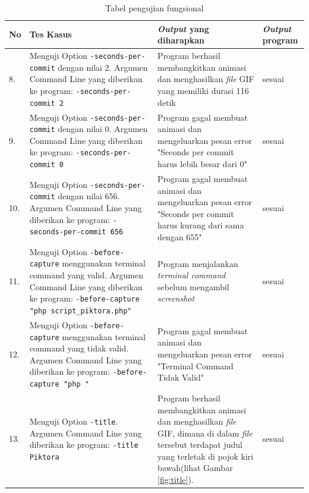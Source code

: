 \begin{table}[htbp]
\begin{tabular}{|p{0.3cm}|>{\raggedright} p{5.5 cm}| p{7 cm}| p{3 cm}|}
		
		
		
		\end{tabular}
	\label{table:hasil_pengujian1}
\end{table}


\begin{table}[htbp]
	\centering
	\caption{Tabel pengujian fungsional}
	
		\begin{tabular}{|p{0.3cm}|>{\raggedright} p{7 cm}| p{5.5 cm}| p{3 cm}|} \hline
		No & Tes Kasus	& \textit{Output} yang diharapkan & \textit{Output} program \\ \hline
		8. & Menguji Option \texttt{-seconds-per-commit} dengan nilai 2. Argumen Command Line yang diberikan ke program: \texttt{-seconds-per-commit 2} & Program berhasil membangkitkan animasi dan menghasilkan \textit{file} GIF yang memiliki durasi 116 detik & sesuai \\ \hline
		9. & Menguji Option \texttt{-seconds-per-commit} dengan nilai 0. Argumen Command Line yang diberikan ke program: \texttt{-seconds-per-commit 0} & Program gagal membuat animasi dan mengeluarkan pesan error "Seconds per commit harus lebih besar dari 0" & sesuai \\ \hline
		10. & Menguji Option \texttt{-seconds-per-commit} dengan nilai 656. Argumen Command Line yang diberikan ke program: \texttt{-seconds-per-commit 656} & Program gagal membuat animasi dan mengeluarkan pesan error "Seconds per commit harus kurang dari sama dengan  655" & sesuai \\ \hline
		11. & Menguji Option \texttt{-before-capture} menggunakan terminal command yang valid. Argumen Command Line yang diberikan ke program: \texttt{-before-capture "php script\_piktora.php"} & Program menjalankan \textit{terminal command} sebelum mengambil \textit{screenshot} & sesuai  \\ \hline
		12. & Menguji Option \texttt{-before-capture} menggunakan terminal command yang tidak valid. Argumen Command Line yang diberikan ke program: \texttt{-before-capture "php "} & Program gagal membuat animasi dan mengeluarkan pesan error "Terminal Command Tidak Valid" & sesuai \\ \hline
		13. & Menguji Option \texttt{-title}. Argumen Command Line yang diberikan ke program: \texttt{-title Piktora}  & Program berhasil membangkitkan animasi dan menghasilkan \textit{file} GIF, dimana di dalam \textit{file} tersebut terdapat judul yang terletak di pojok kiri bawah(lihat Gambar \ref{fig:title}). & sesuai \\ \hline
					

\end{tabular}
\end{table}
